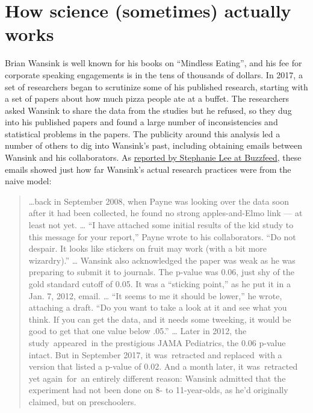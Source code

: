 \documentclass[]{book}
\theoremstyle{definition}
\theoremstyle{definition}
\theoremstyle{definition}
\theoremstyle{remark}
\begin{document}
\section{How science (sometimes) actually
works}\label{how-science-sometimes-actually-works}

Brian Wansink is well known for his books on ``Mindless Eating'', and
his fee for corporate speaking engagements is in the tens of thousands
of dollars. In 2017, a set of researchers began to scrutinize some of
his published research, starting with a set of papers about how much
pizza people ate at a buffet. The researchers asked Wansink to share the
data from the studies but he refused, so they dug into his published
papers and found a large number of inconsistencies and statistical
problems in the papers. The publicity around this analysis led a number
of others to dig into Wansink's past, including obtaining emails between
Wansink and his collaborators. As
\href{https://www.buzzfeednews.com/article/stephaniemlee/brian-wansink-cornell-p-hacking}{reported
by Stephanie Lee at Buzzfeed}, these emails showed just how far
Wansink's actual research practices were from the naive model:

\begin{quote}
\ldots{}back in September 2008, when Payne was looking over the data
soon after it had been collected, he found no strong apples-and-Elmo
link --- at least not yet. \ldots{} ``I have attached some initial
results of the kid study to this message for your report,'' Payne wrote
to his collaborators. ``Do not despair. It looks like stickers on fruit
may work (with a bit more wizardry).'' \ldots{} Wansink also
acknowledged the paper was weak as he was preparing to submit it to
journals. The p-value was 0.06, just shy of the gold standard cutoff of
0.05. It was a ``sticking point,'' as he put it in a Jan. 7, 2012,
email. \ldots{} ``It seems to me it should be lower,'' he wrote,
attaching a draft. ``Do you want to take a look at it and see what you
think. If you can get the data, and it needs some tweeking, it would be
good to get that one value below .05.'' \ldots{} Later in 2012, the
study~appeared~in the prestigious JAMA Pediatrics, the 0.06 p-value
intact. But in September 2017, it was~retracted and replaced~with a
version that listed a p-value of 0.02. And a month later, it
was~retracted yet again~for~an entirely different reason: Wansink
admitted that the experiment had not been done on 8- to 11-year-olds, as
he'd originally claimed, but on preschoolers.
\end{quote}
\end{document}
